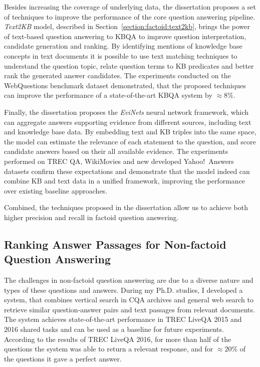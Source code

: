 Besides increasing the coverage of underlying data, the dissertation proposes a set of techniques to improve the performance of the core question answering pipeline.
\textit{Text2KB} model, described in Section~\ref{section:factoid:text2kb}, brings the power of text-based question answering to KBQA to improve question interpretation, candidate generation and ranking.
By identifying mentions of knowledge base concepts in text documents it is possible to use text matching techniques to understand the question topic, relate question terms to KB predicates and better rank the generated answer candidates.
The experiments conducted on the WebQuestions benchmark dataset demonstrated, that the proposed techniques can improve the performance of a state-of-the-art KBQA system by $\approx 8\%$.

Finally, the dissertation proposes the \textit{EviNets} neural network framework, which can aggregate answers supporting evidence from different sources, including text and knowledge base data.
By embedding text and KB triples into the same space, the model can estimate the relevance of each statement to the question, and score candidate answers based on their all available evidence.
The experiments performed on TREC QA, WikiMovies and new developed Yahoo!~Answers datasets confirm these expectations and demonstrate that the model indeed can combine KB and text data in a unified framework, improving the performance over existing baseline approaches.

Combined, the techniques proposed in the dissertation allow us to achieve both higher precision and recall in factoid question answering.

\subsection{Ranking Answer Passages for Non-factoid Question Answering}
\label{section:conclusion:summary:non-factoid}

The challenges in non-factoid question answering are due to a diverse nature and types of these questions and answers.
During my Ph.D. studies, I developed a system, that combines vertical search in CQA archives and general web search to retrieve similar question-answer pairs and text passages from relevant documents.
The system achieves state-of-the-art performance in TREC LiveQA 2015 and 2016 shared tasks and can be used as a baseline for future experiments.
According to the results of TREC LiveQA 2016, for more than half of the questions the system was able to return a relevant response, and for $\approx 20\%$ of the questions it gave a perfect answer.

